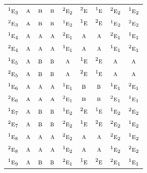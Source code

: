\documentclass[10pt,a4paper]{article}
\numberwithin{equation}{section}
\newcommand{\irr}[1]{\text{\normalfont\scshape #1}}
\newcommand{\conjpair}[1]{{}^{#1}}
\begin{document}
{\begin{longtable}{@{}lcccccccc@{}}
$\conjpair{1}\irr{e}_{3}$ & $\irr{a}$ & $\irr{b}$ & $\irr{b}$ & $\conjpair{2}\irr{e}_{2}$ & $\conjpair{2}\irr{e}$ & $\conjpair{1}\irr{e}$ & $\conjpair{2}\irr{e}_{2}$ & $\conjpair{1}\irr{e}_{2}$\\
$\conjpair{2}\irr{e}_{3}$ & $\irr{a}$ & $\irr{b}$ & $\irr{b}$ & $\conjpair{1}\irr{e}_{2}$ & $\conjpair{1}\irr{e}$ & $\conjpair{2}\irr{e}$ & $\conjpair{1}\irr{e}_{2}$ & $\conjpair{2}\irr{e}_{2}$\\
$\conjpair{1}\irr{e}_{4}$ & $\irr{a}$ & $\irr{a}$ & $\irr{a}$ & $\conjpair{2}\irr{e}_{1}$ & $\irr{a}$ & $\irr{a}$ & $\conjpair{2}\irr{e}_{1}$ & $\conjpair{1}\irr{e}_{1}$\\
$\conjpair{2}\irr{e}_{4}$ & $\irr{a}$ & $\irr{a}$ & $\irr{a}$ & $\conjpair{1}\irr{e}_{1}$ & $\irr{a}$ & $\irr{a}$ & $\conjpair{1}\irr{e}_{1}$ & $\conjpair{2}\irr{e}_{1}$\\
$\conjpair{1}\irr{e}_{5}$ & $\irr{a}$ & $\irr{b}$ & $\irr{b}$ & $\irr{a}$ & $\conjpair{1}\irr{e}$ & $\conjpair{2}\irr{e}$ & $\irr{a}$ & $\irr{a}$\\
$\conjpair{2}\irr{e}_{5}$ & $\irr{a}$ & $\irr{b}$ & $\irr{b}$ & $\irr{a}$ & $\conjpair{2}\irr{e}$ & $\conjpair{1}\irr{e}$ & $\irr{a}$ & $\irr{a}$\\
$\conjpair{1}\irr{e}_{6}$ & $\irr{a}$ & $\irr{a}$ & $\irr{a}$ & $\conjpair{1}\irr{e}_{1}$ & $\irr{b}$ & $\irr{b}$ & $\conjpair{1}\irr{e}_{1}$ & $\conjpair{2}\irr{e}_{1}$\\
$\conjpair{2}\irr{e}_{6}$ & $\irr{a}$ & $\irr{a}$ & $\irr{a}$ & $\conjpair{2}\irr{e}_{1}$ & $\irr{b}$ & $\irr{b}$ & $\conjpair{2}\irr{e}_{1}$ & $\conjpair{1}\irr{e}_{1}$\\
$\conjpair{1}\irr{e}_{7}$ & $\irr{a}$ & $\irr{b}$ & $\irr{b}$ & $\conjpair{1}\irr{e}_{2}$ & $\conjpair{2}\irr{e}$ & $\conjpair{1}\irr{e}$ & $\conjpair{1}\irr{e}_{2}$ & $\conjpair{2}\irr{e}_{2}$\\
$\conjpair{2}\irr{e}_{7}$ & $\irr{a}$ & $\irr{b}$ & $\irr{b}$ & $\conjpair{2}\irr{e}_{2}$ & $\conjpair{1}\irr{e}$ & $\conjpair{2}\irr{e}$ & $\conjpair{2}\irr{e}_{2}$ & $\conjpair{1}\irr{e}_{2}$\\
$\conjpair{1}\irr{e}_{8}$ & $\irr{a}$ & $\irr{a}$ & $\irr{a}$ & $\conjpair{2}\irr{e}_{2}$ & $\irr{a}$ & $\irr{a}$ & $\conjpair{2}\irr{e}_{2}$ & $\conjpair{1}\irr{e}_{2}$\\
$\conjpair{2}\irr{e}_{8}$ & $\irr{a}$ & $\irr{a}$ & $\irr{a}$ & $\conjpair{1}\irr{e}_{2}$ & $\irr{a}$ & $\irr{a}$ & $\conjpair{1}\irr{e}_{2}$ & $\conjpair{2}\irr{e}_{2}$\\
$\conjpair{1}\irr{e}_{9}$ & $\irr{a}$ & $\irr{b}$ & $\irr{b}$ & $\conjpair{2}\irr{e}_{1}$ & $\conjpair{1}\irr{e}$ & $\conjpair{2}\irr{e}$ & $\conjpair{2}\irr{e}_{1}$ & $\conjpair{1}\irr{e}_{1}$\\

\end{longtable}}
\end{document}

